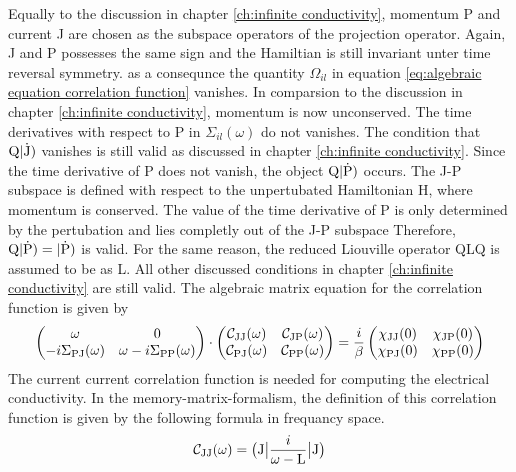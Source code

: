 Equally to the discussion in chapter \ref{ch:infinite conductivity}, momentum P and current J are chosen as the subspace operators of the projection operator.
Again, J and P possesses the same sign and the Hamiltian is still invariant unter time reversal symmetry.
as a consequnce the quantity $\Omega_{il}$ in equation \eqref{eq:algebraic equation correlation function} vanishes.
In comparsion to the discussion in chapter \ref{ch:infinite conductivity}, momentum is now unconserved.
The time derivatives with respect to P in $\Sigma_{il}(\omega)$ do not vanishes.
The condition that $\mathrm{Q}|\mathrm{\dot{J}})$ vanishes is still valid as discussed in chapter \ref{ch:infinite conductivity}.
Since the time derivative of P does not vanish, the object $\mathrm{Q}|\mathrm{\dot{P}})$ occurs.
The J-P subspace is defined with respect to the unpertubated Hamiltonian H, where momentum is conserved.
The value of the time derivative of P is only determined by the pertubation and lies completly out of the J-P subspace
Therefore, $\mathrm{Q}|\mathrm{\dot{P}}) = |\mathrm{\dot{P}})$ is valid.
For the same reason, the reduced Liouville operator QLQ is assumed to be as L.
All other discussed conditions in chapter \ref{ch:infinite conductivity} are still valid.
The algebraic matrix equation for the correlation function is given by
%
\begin{align}
	\begin{pmatrix}
	\omega & 0 \\
	-i\Sigma_{\mathrm{PJ}}(\omega) & \omega - i\Sigma_{\mathrm{PP}}(\omega)
	\end{pmatrix}
	\cdot
	\begin{pmatrix}
	\mathcal{C}_{\mathrm{JJ}}(\omega) &  \mathcal{C}_{\mathrm{JP}}(\omega) \\
	\mathcal{C}_{\mathrm{PJ}}(\omega) &  \mathcal{C}_{\mathrm{PP}}(\omega)
	\end{pmatrix}
	=
	\frac{i}{\beta}
	\begin{pmatrix}
	\chi_{\mathrm{JJ}}(0) &  \chi_{\mathrm{JP}}(0) \\
	\chi_{\mathrm{PJ}}(0) &  \chi_{\mathrm{PP}}(0)
	\end{pmatrix}
	\label{eq:matric equation correlation function unconserved momentum}
\end{align}
%
The current current correlation function is needed for computing the electrical conductivity.
In the memory-matrix-formalism, the definition of this correlation function is given by the following formula in frequancy space.
%
\begin{align}
	\mathcal{C}_{\mathrm{JJ}}(\omega) = \big({\mathrm{J}}\big| \frac{i}{\omega - \mathrm{L}} \big|{\mathrm{J}}\big)
\end{align}
